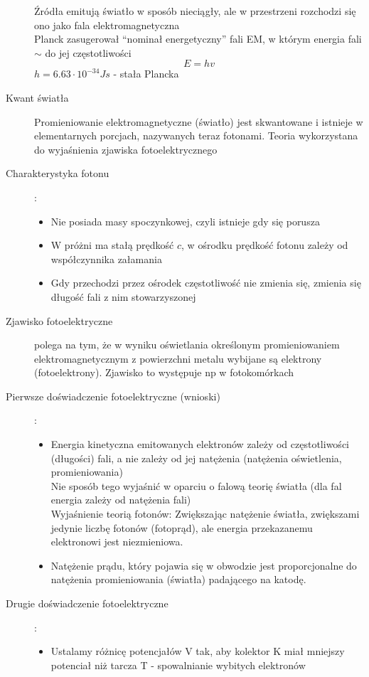 \documentclass[a4paper,11pt]{article}
\begin{document}
\begin{description}
  Źródła emitują światło w sposób nieciągły, ale w przestrzeni rozchodzi się ono jako fala elektromagnetyczna\\
  Planck zasugerował ``nominał energetyczny'' fali EM, w którym energia fali $\sim$ do jej częstotliwości
  $$E=hv$$
  $h=6.63\cdot10^{-34}Js$ - stała Plancka
\item[Kwant światła] Promieniowanie elektromagnetyczne (światło) jest skwantowane i istnieje w elementarnych porcjach, nazywanych teraz fotonami. Teoria wykorzystana do wyjaśnienia zjawiska fotoelektrycznego
\item[Charakterystyka fotonu]:
  \begin{itemize}
  \item Nie posiada masy spoczynkowej, czyli istnieje gdy się porusza
  \item W próżni ma stałą prędkość $c$, w ośrodku prędkość fotonu zależy od współczynnika załamania
  \item Gdy przechodzi przez ośrodek częstotliwość nie zmienia się, zmienia się długość fali z nim stowarzyszonej
  \end{itemize}
\item[Zjawisko fotoelektryczne] polega na tym, że w wyniku oświetlania określonym promieniowaniem elektromagnetycznym z powierzchni metalu wybijane są elektrony (fotoelektrony). Zjawisko to występuje np w fotokomórkach
\item[Pierwsze doświadczenie fotoelektryczne (wnioski)]:\\
  \begin{itemize}
  \item Energia kinetyczna emitowanych elektronów zależy od częstotliwości (długości) fali, a nie zależy od jej natężenia (natężenia oświetlenia, promieniowania)\\
    Nie sposób tego wyjaśnić w oparciu o falową teorię światła (dla fal energia zależy od natężenia fali)\\
    Wyjaśnienie teorią fotonów: Zwiększając natężenie światła, zwiększami jedynie liczbę fotonów (fotoprąd), ale energia przekazanemu elektronowi jest niezmieniowa.
  \item Natężenie prądu, który pojawia się w obwodzie jest proporcjonalne do natężenia promieniowania (światła) padającego na katodę. 
  \end{itemize}
\item[Drugie doświadczenie fotoelektryczne]:\\
  \begin{itemize}
  \item Ustalamy różnicę potencjałów V tak, aby kolektor K miał mniejszy potenciał niż tarcza T - spowalnianie wybitych elektronów

\end{itemize}
\end{description}
\end{document}
